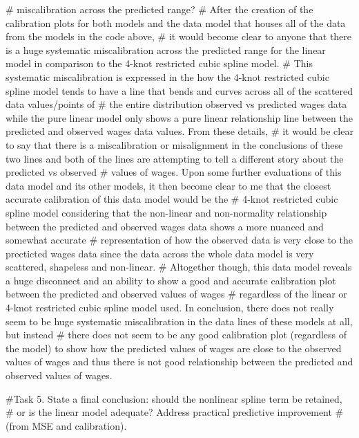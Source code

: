 \documentclass[
  letterpaper,
  DIV=11,
  numbers=noendperiod]{scrreprt}
\newenvironment{Shaded}{\begin{snugshade}}{\end{snugshade}}
\newcommand{\CommentTok}[1]{\textcolor[rgb]{0.37,0.37,0.37}{#1}}
\begin{document}
{\begin{Shaded}
\begin{Highlighting}[]
\CommentTok{\# miscalibration across the predicted range?}
\CommentTok{\# After the creation of the calibration plots for both models and the data model that houses all of the data from the models in the code above,}
\CommentTok{\# it would become clear to anyone that there is a huge systematic miscalibration across the predicted range for the linear model in comparison to the 4{-}knot restricted cubic spline model.}
\CommentTok{\# This systematic miscalibration is expressed in the how the 4{-}knot restricted cubic spline model tends to have a line that bends and curves across all of the scattered data values/points of}
\CommentTok{\# the entire distribution observed vs predicted wages data while the pure linear model only shows a pure linear relationship line between the predicted and observed wages data values. From these details,}
\CommentTok{\# it would be clear to say that there is a miscalibration or misalignment in the conclusions of these two lines and both of the lines are attempting to tell a different story about the predicted vs observed}
\CommentTok{\# values of wages. Upon some further evaluations of this data model and its other models, it then become clear to me that the closest accurate calibration of this data model would be the}
\CommentTok{\# 4{-}knot restricted cubic spline model considering that the non{-}linear and non{-}normality relationship between the predicted and observed wages data shows a more nuanced and somewhat accurate}
\CommentTok{\# representation of how the observed data is very close to the precticted wages data since the data across the whole data model is very scattered, shapeless and non{-}linear.}
\CommentTok{\# Altogether though, this data model reveals a huge disconnect and an ability to show a good and accurate calibration plot between the predicted and observed values of wages}
\CommentTok{\# regardless of the linear or 4{-}knot restricted cubic spline model used. In conclusion, there does not really seem to be huge systematic miscalibration in the data lines of these models at all, but instead }
\CommentTok{\# there does not seem to be any good calibration plot (regardless of the model) to show how the predicted values of wages are close to the observed values of wages and thus there is not good relationship between the predicted and observed values of wages.}


\CommentTok{\#Task 5. State a final conclusion: should the nonlinear spline term be retained, }
\CommentTok{\# or is the linear model adequate? Address practical predictive improvement }
\CommentTok{\#(from MSE and calibration).}


\end{Highlighting}
\end{Shaded}}
\end{document}
